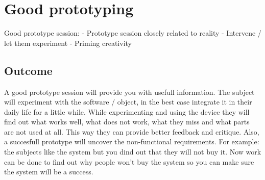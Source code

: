 \documentclass{article}
\begin{document}
\section{Good prototyping}

Good prototype session:
- Prototype session closely related to reality
- Intervene / let them experiment
- Priming creativity 

 
\subsection{Outcome}
A good prototype session will provide you with usefull information. The subject
will experiment with the software / object, in the best case integrate it in their
daily life for a little while. While experimenting and using the device they will
find out what works well, what does not work, what they miss and what parts
are not used at all. This way they can provide better feedback and critique.
Also, a succesfull prototype will uncover the non-functional requirements.
For example: the subjects like the system but you dind out that they will not
buy it. Now work can be done to find out why people won't buy the system so you can make sure the system will be a success.





\end{document}
